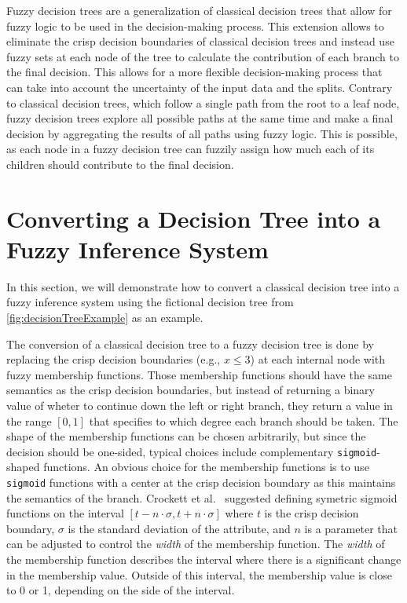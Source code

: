 Fuzzy decision trees are a generalization of classical decision trees that allow for fuzzy logic to be used in the decision-making process. This extension allows to eliminate the crisp decision boundaries of classical decision trees and instead use fuzzy sets at each node of the tree to calculate the contribution of each branch to the final decision. This allows for a more flexible decision-making process that can take into account the uncertainty of the input data and the splits. Contrary to classical decision trees, which follow a single path from the root to a leaf node, fuzzy decision trees explore all possible paths at the same time and make a final decision by aggregating the results of all paths using fuzzy logic. This is possible, as each node in a fuzzy decision tree can fuzzily assign how much each of its children should contribute to the final decision.

\section{Converting a Decision Tree into a Fuzzy Inference System}


In this section, we will demonstrate how to convert a classical decision tree into a fuzzy inference system using the fictional decision tree from \autoref{fig:decisionTreeExample} as an example.

The conversion of a classical decision tree to a fuzzy decision tree is done by replacing the crisp decision boundaries (e.g., $x \leq 3$) at each internal node with fuzzy membership functions. Those membership functions should have the same semantics as the crisp decision boundaries, but instead of returning a binary value of wheter to continue down the left or right branch, they return a value in the range $[0,1]$ that specifies to which degree each branch should be taken. The shape of the membership functions can be chosen arbitrarily, but since the decision should be one-sided, typical choices include complementary \texttt{sigmoid}-shaped functions.
An obvious choice for the membership functions is to use \texttt{sigmoid} functions with a center at the crisp decision boundary as this maintains the semantics of the branch. Crockett et al.~\cite{CROCKETT20062809} suggested defining symetric sigmoid functions on the interval $[t-n\cdot \sigma, t+n\cdot \sigma]$ where $t$ is the crisp decision boundary, $\sigma$ is the standard deviation of the attribute, and $n$ is a parameter that can be adjusted to control the \emph{width} of the membership function. The \emph{width} of the membership function describes the interval where there is a significant change in the membership value. Outside of this interval, the membership value is close to 0 or 1, depending on the side of the interval.

